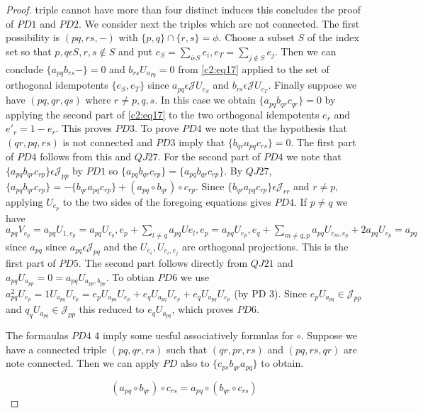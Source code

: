 \begin{proof}
triple cannot have more than four distinct induces this concludes the
proof of $PD 1$ and $PD 2$. We consider next the triples which are not
connected. The first possibility is $(pq, rs,-)$ with
$\{p,q\}\cap\{r,s\}=\phi$. Choose a subset $S$ of the index set so
that $p,q\epsilon S, r, s\notin S$ and put $e_S=\sum\limits_{i\epsilon
  S}e_i,e_T=\sum\limits_{j\notin S}e_j$. Then we can conclude $\{a_{pq}
b_{rs}-\}=0$ and $b_{rs} U_{a_{Pq}}=0$ from \eqref{c2:eq17} applied to the set of
orthogonal idempotents $\{e_S,e_T\}$ since $a_{pq}\epsilon \mathscr{J}
U_{e_{S}}$ and $b_{rs}\epsilon \mathscr{J} U_{e_{T}}$. Finally suppose
we have $(pq, qr, qs)$ where $r\neq p,q,s$. In this case we obtain
$\{a_{pq}b_{qr}c_{qr}\}=0$ by applying the second part of \eqref{c2:eq17} to the
two orthogonal idempotents $e_r$ and $e'_r=1-e_r$. This proves $PD
3$. To prove $PD 4$ we note that the hypothesis that $(qr, pq, rs)$ is
not connected and $PD 3$ imply that $\{b_{qr}a_{pq}c_{rs}\}=0$. The
first part of $PD 4$ follows from this and $QJ 27$. For the second
part of $PD 4$ we note that $\{a_{pq}b_{qr}c_{rp}\}\epsilon
\mathscr{J}_{pp}$ by $PD 1$ so
$\{a_{pq}b_{qr}c_{rp}\}=\{a_{pq}b_{qr}c_{rp}\}$. By $QJ 27$,       
$\{a_{pq}b_{qr}c_{rp}\}=-\{b_{qr}a_{pq}c_{rp}\}+(a_{pq}\circ
  b_{qr})\circ c_{rp}$. Since $\{b_{qr}a_{pq}c_{rp}\}\epsilon
  \mathscr{J}_{rr}$ and $r\neq p$, applying $U_{e_{p}}$ to the two
  sides of the foregoing equations gives $PD 4$. If $p\neq q$ we have
  $a_{pq}V_{e_{p}}=a_{pq}U_{1,e_{p}}=a_{pq}U_{e_{q}},e_p
  +\sum\limits_{l\neq
    q}a_{pq}Ue_{l},e_{p}=a_{pq}U_{e_{p}},e_q+\sum\limits_{m\neq q,
    p}a_{pq}U_{e_{m},e_{p}}+2a_{pq}U_{e_{p}}=a_{pq}$ since $a_{pq}$
  since $a_{pq}\epsilon \mathscr{J}_{pq}$ and the\pageoriginale
  $U_{e_{i}},U_{e_{i},e_{j}}$ are orthogonal projections. This is the
  first part of $PD 5$. The second part follows directly from $QJ 21$
  and $a_{pq} U_{a_{pp}}=0=a_{pq} U_{a_{pp},b_{pp}}$. To obtian $PD
  6$ we use
  $a^{2}_{pq}U_{e_{p}}=1U_{a_{pq}}U_{e_{p}}=e_{p}U_{a_{pq}}U_{e_{p}}+e_q
  U_{a_{pq}} U_{e_{p}}+e_qU_{a_{pq}}U_{e_{p}}$ (by PD 3). Since
  $e_p U_{a_{pq}}\in \mathscr{J}_{pp}$ and $q_q U_{a_{pq}} \in
  \mathscr{J}_{pp}$ this reduced to $e_qU_{a_{pq}}$, which proves $PD 6$.

The formaulas $PD 4$ 4 imply some uesful associatively formulas for
$\circ$. Suppose we have a connected triple $(pq, qr,rs)$ such that
$(qr, pr, rs)$ and $(pq, rs, qr)$ are note connected. Then we can
apply $PD $ also to $\{c_{ps}b_{qr}a_{pq}\}$ to obtain.

\begin{equation*}
(a_{pq}\circ b_{qr})\circ c_{rs}=a_{pq}\circ (b_{qr}\circ
  c_{rs})\tag{22}\label{c2:eq22}
\end{equation*}


\end{proof}
